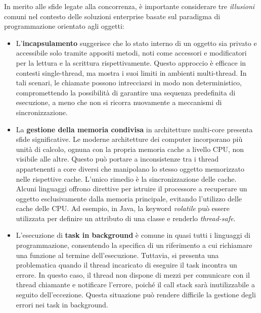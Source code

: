In merito alle sfide legate alla concorrenza, è importante considerare tre \textit{illusioni} comuni nel contesto delle soluzioni enterprise basate sul paradigma di programmazione orientato agli oggetti:
\begin{itemize}
    \item L'\textbf{incapsulamento} suggerisce che lo stato interno di un oggetto sia privato e accessibile solo tramite appositi metodi, noti come accessori e modificatori per la lettura e la scrittura rispettivamente.
    Questo approccio è efficace in contesti single-thread, ma mostra i suoi limiti in ambienti multi-thread.
    In tali scenari, le chiamate possono intrecciarsi in modo non deterministico, compromettendo la possibilità di garantire una sequenza predefinita di esecuzione, a meno che non si ricorra nuovamente a meccanismi di sincronizzazione.
    \item La \textbf{gestione della memoria condivisa} in architetture multi-core presenta sfide significative. Le moderne architetture dei computer incorporano più unità di calcolo, ognuna con la propria memoria cache a livello CPU, non visibile alle altre.
    Questo può portare a inconsistenze tra i thread appartenenti a core diversi che manipolano lo stesso oggetto memorizzato nelle rispettive cache.
    L'unico rimedio è la sincronizzazione delle cache.
    Alcuni linguaggi offrono direttive per istruire il processore a recuperare un oggetto esclusivamente dalla memoria principale, evitando l'utilizzo delle cache delle CPU.
    Ad esempio, in Java, la keyword \textit{volatile} può essere utilizzata per definire un attributo di una classe e renderlo \textit{thread-safe}.
    \item L'esecuzione di \textbf{task in background} è comune in quasi tutti i linguaggi di programmazione, consentendo la specifica di un riferimento a cui richiamare una funzione al termine dell'esecuzione.
    Tuttavia, si presenta una problematica quando il thread incaricato di eseguire il task incontra un errore.
    In questo caso, il thread non dispone di mezzi per comunicare con il thread chiamante e notificare l'errore, poiché il call stack sarà inutilizzabile a seguito dell'eccezione.
    Questa situazione può rendere difficile la gestione degli errori nei task in background.
\end{itemize}

